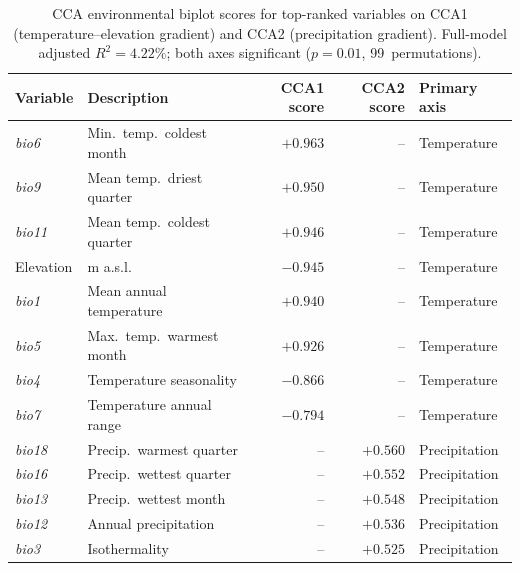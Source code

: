 \documentclass[review,12pt,a4paper]{elsarticle}
\begin{document}
\clearpage

\begin{table}[htbp]
\caption{CCA environmental biplot scores for top-ranked variables on CCA1
(temperature--elevation gradient) and CCA2 (precipitation gradient).
Full-model adjusted $R^2 = 4.22\%$; both axes significant ($p = 0.01$,
99~permutations).}
\label{tab:cca}
\centering
\begin{tabular}{llrrl}
\toprule
Variable & Description & CCA1 score & CCA2 score & Primary axis \\
\midrule
\textit{bio6}  & Min.\ temp.\ coldest month     & $+0.963$ & --       & Temperature \\
\textit{bio9}  & Mean temp.\ driest quarter     & $+0.950$ & --       & Temperature \\
\textit{bio11} & Mean temp.\ coldest quarter    & $+0.946$ & --       & Temperature \\
Elevation      & m a.s.l.                       & $-0.945$ & --       & Temperature \\
\textit{bio1}  & Mean annual temperature        & $+0.940$ & --       & Temperature \\
\textit{bio5}  & Max.\ temp.\ warmest month     & $+0.926$ & --       & Temperature \\
\textit{bio4}  & Temperature seasonality        & $-0.866$ & --       & Temperature \\
\textit{bio7}  & Temperature annual range       & $-0.794$ & --       & Temperature \\
\textit{bio18} & Precip.\ warmest quarter       & --       & $+0.560$ & Precipitation \\
\textit{bio16} & Precip.\ wettest quarter       & --       & $+0.552$ & Precipitation \\
\textit{bio13} & Precip.\ wettest month         & --       & $+0.548$ & Precipitation \\
\textit{bio12} & Annual precipitation           & --       & $+0.536$ & Precipitation \\
\textit{bio3}  & Isothermality                  & --       & $+0.525$ & Precipitation \\
\bottomrule
\end{tabular}
\end{table}

\clearpage
\end{document}
